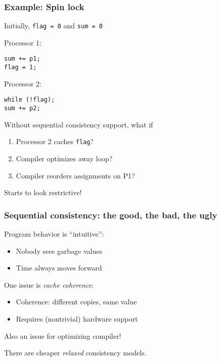 \documentclass{beamer}
\begin{document}
\begin{frame}[fragile]
  \frametitle{Example: Spin lock}

Initially, {\tt flag = 0} and {\tt sum = 0}

\vspace{5mm}
\hspace{0.04\textwidth}
\begin{minipage}{0.45\textwidth}
Processor 1:
\begin{verbatim}
sum += p1;
flag = 1;
\end{verbatim}
\end{minipage}
\begin{minipage}{0.45\textwidth}
Processor 2:
\begin{verbatim}
while (!flag);
sum += p2;
\end{verbatim}
\end{minipage}

\vspace{5mm}
Without sequential consistency support, what if
\begin{enumerate}
\item Processor 2 caches {\tt flag}?
\item Compiler optimizes away loop?
\item Compiler reorders assignments on P1?
\end{enumerate}
Starts to look restrictive!

\end{frame}


\begin{frame}
  \frametitle{Sequential consistency: the good, the bad, the ugly}
  
  Program behavior is ``intuitive'':
  \begin{itemize}
  \item Nobody sees garbage values
  \item Time always moves forward
  \end{itemize}
  One issue is {\em cache coherence}:
  \begin{itemize}
  \item Coherence: different copies, same value
  \item Requires (nontrivial) hardware support
  \end{itemize}
  Also an issue for optimizing compiler!

  \vspace{1cm}
  There are cheaper {\em relaxed} consistency models.
\end{frame}
\end{document}
